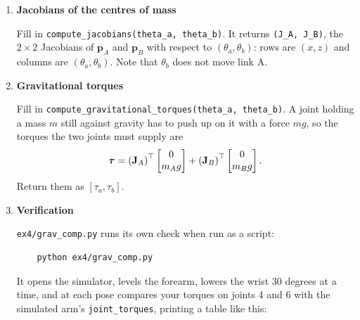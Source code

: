 \documentclass{16384_doc}
\begin{document}
\begin{questions}
\begin{enumerate} [label=\alph*.]
        All of these numbers are measured from the robot model the simulator
        runs, and are given at the top of the file. \verb!planar_angles! (the
        arm's seven joint values to $\theta_a$, $\theta_b$) and
        \verb!to_joint_torques! (planar torques to the arm's joint 4 and joint 6
        torques) are provided; do not modify them.

        With $R(\cdot)$ the $2 \times 2$ rotation matrix, the two centres of mass
        are at
        \[
            \mathbf{p}_A = R(\theta_a)\,\mathbf{c}_A, \qquad
            \mathbf{p}_B = R(\theta_a) \colvec{L_A\\0}
                + R(\theta_a + \theta_b)\,\mathbf{c}_B
        \]
        relative to the elbow, where $L_A$ is \verb!LINK_A_LENGTH! and
        $\mathbf{c}_A$, $\mathbf{c}_B$ are \verb!COM_A!, \verb!COM_B!.

        \item \text{[7 points]} \textbf{Jacobians of the centres of mass}

        Fill in \verb!compute_jacobians(theta_a, theta_b)!. It returns
        \verb!(J_A, J_B)!, the $2 \times 2$ Jacobians of $\mathbf{p}_A$ and
        $\mathbf{p}_B$ with respect to $(\theta_a, \theta_b)$: rows are $(x, z)$
        and columns are $(\theta_a, \theta_b)$. Note that $\theta_b$ does not
        move link A.

        \item \text{[8 points]} \textbf{Gravitational torques}

        Fill in \verb!compute_gravitational_torques(theta_a, theta_b)!. A joint
        holding a mass $m$ still against gravity has to push up on it with a
        force $m g$, so the torques the two joints must supply are
        \[
            \boldsymbol{\tau} = \left(\mathbf{J}_A\right)^{\top} \begin{bmatrix}0\\m_A g\end{bmatrix}
                + \left(\mathbf{J}_B\right)^{\top} \begin{bmatrix}0\\m_B g\end{bmatrix}.
        \]
        Return them as $[\tau_a, \tau_b]$.

        \item \textbf{Verification}

        \verb!ex4/grav_comp.py! runs its own check when run as a script:

\begin{verbatim}
    python ex4/grav_comp.py
\end{verbatim}

        It opens the simulator, levels the forearm, lowers the wrist 30 degrees
        at a time, and at each pose compares your torques on joints 4 and 6 with
        the simulated arm's \verb!joint_torques!, printing a table like this:


\end{enumerate}
\end{questions}
\end{document}
